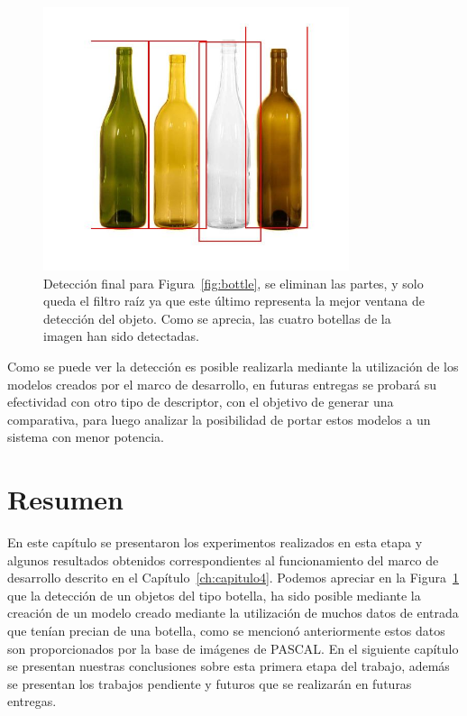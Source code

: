 \begin{figure}[tb]
\centering
 \includegraphics[width=0.8\textwidth]{Figuras/results/bottle-final.jpg}
 \caption[Detección final para un objeto]{Detección final para Figura~\ref{fig:bottle}, se eliminan las partes, y solo queda el filtro raíz ya que este último representa la mejor ventana de detección del objeto. Como se aprecia, las cuatro botellas de la imagen han sido detectadas.}
 \label{fig:bottle-final}
\end{figure}

Como se puede ver la detección es posible realizarla mediante la utilización de los modelos creados por el marco de desarrollo, en futuras entregas se probará su efectividad con otro tipo de descriptor, con el objetivo de generar una comparativa, para luego analizar la posibilidad de portar estos modelos a un sistema con menor potencia.
\section{Resumen}
En este capítulo se presentaron los experimentos realizados en esta etapa y algunos resultados obtenidos correspondientes al funcionamiento del marco de desarrollo descrito en el Capítulo~\ref{ch:capitulo4}. Podemos apreciar en la Figura~\ref{fig:bottle-final} que la detección de un objetos del tipo botella, ha sido posible mediante la creación de un modelo creado mediante la utilización de muchos datos de entrada que tenían precian de una botella, como se mencionó anteriormente estos datos son proporcionados por la base de imágenes de PASCAL. En el siguiente capítulo se presentan nuestras conclusiones sobre esta primera etapa del trabajo, además se presentan los trabajos pendiente y futuros que se realizarán en futuras entregas.


